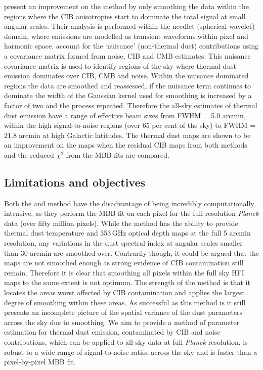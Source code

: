 \documentclass[a4paper,fleqn,usenatbib]{mnras}
\begin{document}
\citet{gnilc} present an improvement on the \citet{pr2} method by only smoothing the data within the regions where the CIB anisotropies start to dominate the total signal at small angular scales. Their analysis is performed within the needlet (spherical wavelet) domain, where emissions are modelled as transient waveforms within pixel and harmonic space. \citet{gnilc} account for the `nuisance'  (non-thermal dust) contributions using a covariance matrix formed from noise, CIB and CMB estimates. This nuisance covariance matrix is used to identify regions of the sky where thermal dust emission dominates over CIB, CMB and noise. Within the nuisance dominated regions the data are smoothed and reassessed, if the nuisance term continues to dominate the width of the Gaussian kernel used for smoothing is increased by a factor of two and the process repeated. Therefore the \citet{gnilc} all-sky estimates of thermal dust emission have a range of effective beam sizes from FWHM = 5.0 arcmin, within the high signal-to-noise regions (over 65 per cent of the sky) to FWHM = 21.8 arcmin at high Galactic latitudes. The \citet{gnilc} thermal dust maps are shown to be an improvement on the \citet{pr2} maps when the residual CIB maps from both methods and the reduced $\chi^2$ from the MBB fits are compared. 

\subsection{Limitations and objectives}

Both the \citet{pr2} and \citet{gnilc} method have the disadvantage of being incredibly computationally intensive, as they perform the MBB fit on each pixel for the full resolution {\it{Planck}} data (over fifty million pixels). While the \citet{pr2} method has the ability to provide thermal dust temperature and 353\,GHz optical depth maps at the full 5 arcmin resolution, any variations in the dust spectral index at angular scales smaller than 30 arcmin are smoothed over. Contrarily though, it could be argued that the \citet{pr2} maps are not smoothed enough as strong evidence of CIB contamination still remain. Therefore it is clear that smoothing all pixels within the full sky HFI maps to the same extent is not optimum. The strength of the \citet{gnilc} method is that it locates the areas worst affected by CIB contamination and applies the largest degree of smoothing within these areas. As successful  as this method is it still presents an incomplete picture of the spatial variance of the dust parameters across the sky due to smoothing. We aim to provide a method of parameter estimation for thermal dust emission, contaminated by CIB and noise contributions, which can be applied to all-sky data at full {\it{Planck}} resolution, is robust to a wide range of signal-to-noise ratios across the sky and is faster than a pixel-by-pixel MBB fit. 
\end{document}

